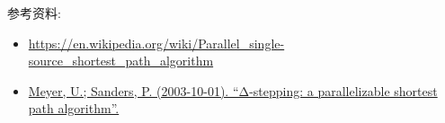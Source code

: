 \documentclass[a4paper, justified]{tufte-handout}
\begin{document}
\begin{solution}
\end{solution}


\begin{problem}[TC 24.3-7]
\end{problem}

\begin{solution}
\end{solution}

\begin{problem}[TC 24.5-2]
\end{problem}

\begin{solution}
\end{solution}

\begin{problem}[TC 24.5-5]
\end{problem}

\begin{solution}
\end{solution}

\begin{problem}[TC Problem 24-3]
\end{problem}

\begin{solution}
\end{solution}



\beginoptional

\begin{problem}[TC Problem 24-2]
\end{problem}

\begin{solution}
\end{solution}


\beginot
\begin{ot}

	\noindent 参考资料:
	\begin{itemize}
	\item \href{https://en.wikipedia.org/wiki/Parallel_single-source_shortest_path_algorithm}{https://en.wikipedia.org/wiki/Parallel\_single-source\_shortest\_path\_algorithm}
	\item 	\href{https://www.sciencedirect.com/science/article/pii/S0196677403000762?via\%3Dihub} {Meyer, U.; Sanders, P. (2003-10-01). ``Δ-stepping: a parallelizable shortest path algorithm''. }
	\end{itemize}
	
	
\end{ot}
\end{document}
